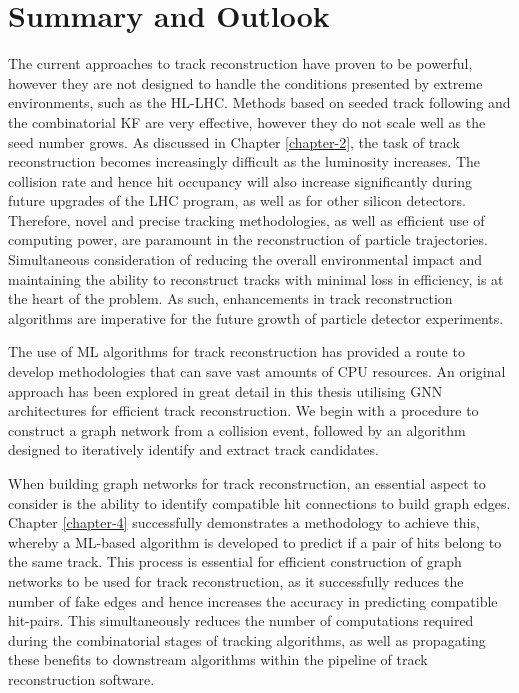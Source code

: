 

\chapter{Summary and Outlook}
\label{chapter-8}


The current approaches to track reconstruction have proven to be powerful, however they are not designed to handle the conditions presented by extreme environments, such as the HL-LHC. Methods based on seeded track following and the combinatorial KF are very effective, however they do not scale well as the seed number grows. As discussed in Chapter \ref{chapter-2}, the task of track reconstruction becomes increasingly difficult as the luminosity increases. The collision rate and hence hit occupancy will also increase significantly during future upgrades of the LHC program, as well as for other silicon detectors. Therefore, novel and precise tracking methodologies, as well as efficient use of computing power, are paramount in the reconstruction of particle trajectories. Simultaneous consideration of reducing the overall environmental impact and maintaining the ability to reconstruct tracks with minimal loss in efficiency, is at the heart of the problem. As such, enhancements in track reconstruction algorithms are imperative for the future growth of particle detector experiments. 

The use of ML algorithms for track reconstruction has provided a route to develop methodologies that can save vast amounts of CPU resources. An original approach has been explored in great detail in this thesis utilising GNN architectures for efficient track reconstruction. We begin with a procedure to construct a graph network from a collision event, followed by an algorithm designed to iteratively identify and extract track candidates. 




When building graph networks for track reconstruction, an essential aspect to consider is the ability to identify compatible hit connections to build graph edges. Chapter \ref{chapter-4} successfully demonstrates a methodology to achieve this, whereby a ML-based algorithm is developed to predict if a pair of hits belong to the same track. This process is essential for efficient construction of graph networks to be used for track reconstruction, as it successfully reduces the number of fake edges and hence increases the accuracy in predicting compatible hit-pairs. This simultaneously reduces the number of computations required during the combinatorial stages of tracking algorithms, as well as propagating these benefits to downstream algorithms within the pipeline of track reconstruction software.

